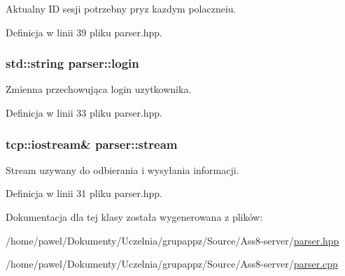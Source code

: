 Aktualny ID sesji potrzebny pryz kazdym polaczneiu. 



Definicja w linii 39 pliku parser.hpp.\hypertarget{a00005_8bb124a2f285074773d1b0ee62cf0cc0}{
\subsubsection[{login}]{\setlength{\rightskip}{0pt plus 5cm}std::string {\bf parser::login}}}
\label{dd/dad/a00005_8bb124a2f285074773d1b0ee62cf0cc0}


Zmienna przechowująca login uzytkownika. 



Definicja w linii 33 pliku parser.hpp.\hypertarget{a00005_f95fb0cac229181329fa61f7bc72c65b}{
\subsubsection[{stream}]{\setlength{\rightskip}{0pt plus 5cm}tcp::iostream\& {\bf parser::stream}}}
\label{dd/dad/a00005_f95fb0cac229181329fa61f7bc72c65b}


Stream uzywany do odbierania i wysyłania informacji. 



Definicja w linii 31 pliku parser.hpp.

Dokumentacja dla tej klasy została wygenerowana z plików:\begin{CompactItemize}
\item 
/home/pawel/Dokumenty/Uczelnia/grupappz/Source/Ass8-server/\hyperlink{a00015}{parser.hpp}\item 
/home/pawel/Dokumenty/Uczelnia/grupappz/Source/Ass8-server/\hyperlink{a00014}{parser.cpp}\end{CompactItemize}
